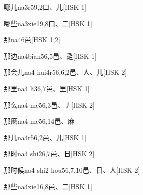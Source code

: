 \begin{entry}{哪儿}{na3r5}{9,2}{⼝、⼉}[HSK 1]
\end{entry}

\begin{entry}{哪些}{na3xie1}{9,8}{⼝、⼆}[HSK 1]
\end{entry}

\begin{entry}{那}{na4}{6}{⾢}[HSK 1,2]
\end{entry}

\begin{entry}{那边}{na4bian5}{6,5}{⾢、⾡}[HSK 1]
\end{entry}

\begin{entry}{那会儿}{na4 hui4r5}{6,6,2}{⾢、⼈、⼉}[HSK 2]
\end{entry}

\begin{entry}{那里}{na4 li3}{6,7}{⾢、⾥}[HSK 1]
\end{entry}

\begin{entry}{那么}{na4 me5}{6,3}{⾢、⼃}[HSK 2]
\end{entry}

\begin{entry}{那麽}{na4 me5}{6,14}{⾢、⿇}
\end{entry}

\begin{entry}{那儿}{na4r5}{6,2}{⾢、⼉}[HSK 1]
\end{entry}

\begin{entry}{那时}{na4 shi2}{6,7}{⾢、⽇}[HSK 2]
\end{entry}

\begin{entry}{那时候}{na4 shi2 hou5}{6,7,10}{⾢、⽇、⼈}[HSK 2]
\end{entry}

\begin{entry}{那些}{na4xie1}{6,8}{⾢、⼆}[HSK 1]
\end{entry}

